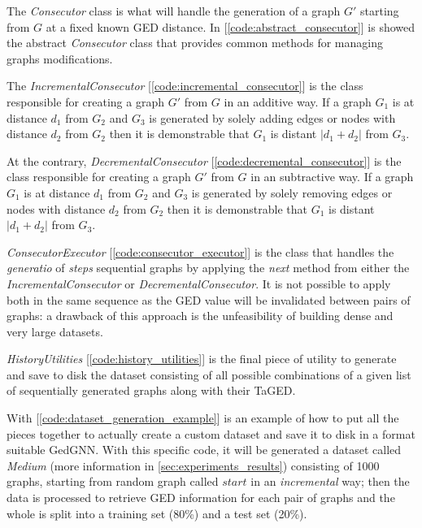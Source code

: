 \documentclass[../Thesis.tex]{subfiles}
\begin{document}
	
	The \textit{Consecutor} class is what will handle the generation of a graph $G'$ starting from $G$ at a fixed known GED distance. In [\autoref{code:abstract_consecutor}] is showed the abstract \textit{Consecutor} class that provides common methods for managing graphs modifications.
	
	
	The \textit{IncrementalConsecutor} [\autoref{code:incremental_consecutor}] is the class responsible for creating a graph $G'$ from $G$ in an additive way. If a graph $G_1$ is at distance $d_1$ from $G_2$ and $G_3$ is generated by solely adding edges or nodes with distance $d_2$ from $G_2$ then it is demonstrable that $G_1$ is distant $|d_1 + d_2|$ from $G_3$.
	
	
	At the contrary, \textit{DecrementalConsecutor} [\autoref{code:decremental_consecutor}] is the class responsible for creating a graph $G'$ from $G$ in an subtractive way. If a graph $G_1$ is at distance $d_1$ from $G_2$ and $G_3$ is generated by solely removing edges or nodes with distance $d_2$ from $G_2$ then it is demonstrable that $G_1$ is distant $|d_1 + d_2|$ from $G_3$.
	
	
	\textit{ConsecutorExecutor} [\autoref{code:consecutor_executor}] is the class that handles the \emph{generatio} of \emph{steps} sequential graphs by applying the \emph{next} method from either the \textit{IncrementalConsecutor} or \textit{DecrementalConsecutor}. It is not possible to apply both in the same sequence as the GED value will be invalidated between pairs of graphs: a drawback of this approach is the unfeasibility of building dense and very large datasets.
	
	
	\textit{HistoryUtilities} [\autoref{code:history_utilities}] is the final piece of utility to generate and save to disk the dataset consisting of all possible combinations of a given list of sequentially generated graphs along with their TaGED.  
	
	
	With [\autoref{code:dataset_generation_example}] is an example of how to put all the pieces together to actually create a custom dataset and save it to disk in a format suitable GedGNN. With this specific code, it will be generated a dataset called \textit{Medium} (more information in \autoref{sec:experiments_results}) consisting of 1000 graphs, starting from random graph called $start$ in an \textit{incremental} way; then the data is processed to retrieve GED information for each pair of graphs and the whole is split into a training set (80\%) and a test set (20\%).
	
\end{document}
